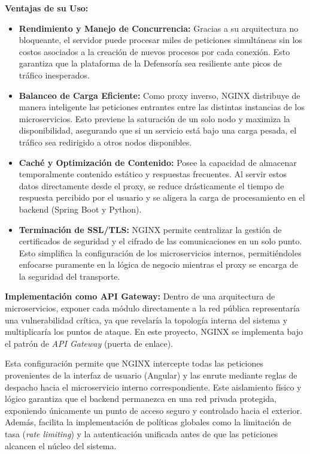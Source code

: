 \textbf{Ventajas de su Uso:}
\begin{itemize}
    \item \textbf{Rendimiento y Manejo de Concurrencia:} Gracias a su arquitectura no bloqueante, el servidor puede procesar miles de peticiones simultáneas sin los costos asociados a la creación de nuevos procesos por cada conexión. Esto garantiza que la plataforma de la Defensoría sea resiliente ante picos de tráfico inesperados.
    
    \item \textbf{Balanceo de Carga Eficiente:} Como proxy inverso, NGINX distribuye de manera inteligente las peticiones entrantes entre las distintas instancias de los microservicios. Esto previene la saturación de un solo nodo y maximiza la disponibilidad, asegurando que si un servicio está bajo una carga pesada, el tráfico sea redirigido a otros nodos disponibles.
    
    \item \textbf{Caché y Optimización de Contenido:} Posee la capacidad de almacenar temporalmente contenido estático y respuestas frecuentes. Al servir estos datos directamente desde el proxy, se reduce drásticamente el tiempo de respuesta percibido por el usuario y se aligera la carga de procesamiento en el backend (Spring Boot y Python).
    
    \item \textbf{Terminación de SSL/TLS:} NGINX permite centralizar la gestión de certificados de seguridad y el cifrado de las comunicaciones en un solo punto. Esto simplifica la configuración de los microservicios internos, permitiéndoles enfocarse puramente en la lógica de negocio mientras el proxy se encarga de la seguridad del transporte.
\end{itemize}

\textbf{Implementación como API Gateway:}
Dentro de una arquitectura de microservicios, exponer cada módulo directamente a la red pública representaría una vulnerabilidad crítica, ya que revelaría la topología interna del sistema y multiplicaría los puntos de ataque. En este proyecto, NGINX se implementa bajo el patrón de \textit{API Gateway} (puerta de enlace). 



Esta configuración permite que NGINX intercepte todas las peticiones provenientes de la interfaz de usuario (Angular) y las enrute mediante reglas de despacho hacia el microservicio interno correspondiente. Este aislamiento físico y lógico garantiza que el backend permanezca en una red privada protegida, exponiendo únicamente un punto de acceso seguro y controlado hacia el exterior. Además, facilita la implementación de políticas globales como la limitación de tasa (\textit{rate limiting}) y la autenticación unificada antes de que las peticiones alcancen el núcleo del sistema.
